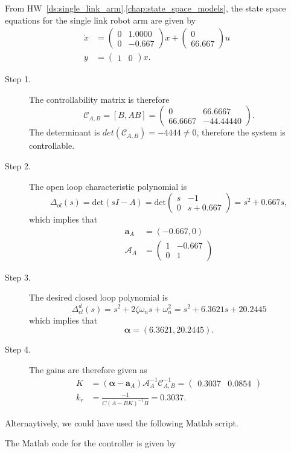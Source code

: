 
From HW~\ref{ds:single_link_arm}.\ref{chap:state_space_models}, the state space equations for the single link robot arm are given by
\begin{align*}
\dot{x} &= \begin{pmatrix} 0 &   1.0000 \\ 0 &  -0.667 \end{pmatrix}x + \begin{pmatrix} 0 \\ 66.667 \end{pmatrix} u \\
y &= \begin{pmatrix}1 & 0 \end{pmatrix}x.
\end{align*}
\begin{description}
\item[Step 1.] 
The controllability matrix is therefore
\[
\mathcal{C}_{A,B} = [B, AB] = \begin{pmatrix}  0 & 66.6667 \\ 66.6667 &  -44.44440 \end{pmatrix}.
\]
The determinant is $det(\mathcal{C}_{A,B})=-4444\neq 0$, therefore the system is controllable.  
\item[Step 2.] The open loop characteristic polynomial is
\[
\Delta_{ol}(s)=\text{det}(sI-A) = \text{det}\begin{pmatrix} s & -1 \\ 0 & s+0.667 \end{pmatrix} = s^2 +0.667 s,
\]
which implies that
\begin{align*}
\mathbf{a}_A &= (-0.667, 0) \\
\mathcal{A}_A &= \begin{pmatrix} 
1 & -0.667 \\ 0 & 1
\end{pmatrix}
\end{align*}

\item[Step 3.] The desired closed loop polynomial is
\[
\Delta_{cl}^d(s) = s^2+2\zeta\omega_n s + \omega_n^2=s^2+6.3621s+20.2445       
\]
which implies that
\[
\boldsymbol{\alpha} = (6.3621, 20.2445).
\]

\item[Step 4.]
The gains are therefore given as
\begin{align*}
K &= (\boldsymbol{\alpha}-\mathbf{a}_A)\mathcal{A}_A^{-1}\mathcal{C}_{A,B}^{-1} 
   = \begin{pmatrix} 0.3037  &  0.0854 \end{pmatrix} \\
k_r &= \frac{-1}{C(A-BK)^{-1}B} 
     = 0.3037.
\end{align*}
\end{description}

Alternaytively, we could have used the following Matlab script.


The Matlab code for the controller is given by




